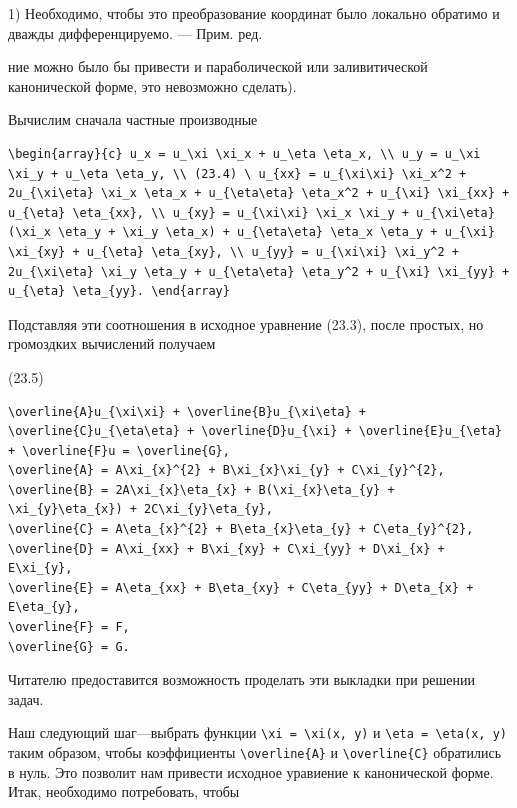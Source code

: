 \documentclass[
  ukrainian,
]{article}
\begin{document}
1) Необходимо, чтобы это преобразование координат было локально обратимо
и дважды дифференцируемо. --- Прим. ред.

ние можно было бы привести и параболической или заливитической
канонической форме, это невозможно сделать).

Вычислим сначала частные производные

\begin{verbatim}
\begin{array}{c} u_x = u_\xi \xi_x + u_\eta \eta_x, \\ u_y = u_\xi \xi_y + u_\eta \eta_y, \\ (23.4) \ u_{xx} = u_{\xi\xi} \xi_x^2 + 2u_{\xi\eta} \xi_x \eta_x + u_{\eta\eta} \eta_x^2 + u_{\xi} \xi_{xx} + u_{\eta} \eta_{xx}, \\ u_{xy} = u_{\xi\xi} \xi_x \xi_y + u_{\xi\eta} (\xi_x \eta_y + \xi_y \eta_x) + u_{\eta\eta} \eta_x \eta_y + u_{\xi} \xi_{xy} + u_{\eta} \eta_{xy}, \\ u_{yy} = u_{\xi\xi} \xi_y^2 + 2u_{\xi\eta} \xi_y \eta_y + u_{\eta\eta} \eta_y^2 + u_{\xi} \xi_{yy} + u_{\eta} \eta_{yy}. \end{array}
\end{verbatim}

Подставляя эти соотношения в исходное уравнение (23.3), после простых,
но громоздких вычислений получаем

(23.5)

\begin{verbatim}
\overline{A}u_{\xi\xi} + \overline{B}u_{\xi\eta} + \overline{C}u_{\eta\eta} + \overline{D}u_{\xi} + \overline{E}u_{\eta} + \overline{F}u = \overline{G},
\overline{A} = A\xi_{x}^{2} + B\xi_{x}\xi_{y} + C\xi_{y}^{2},
\overline{B} = 2A\xi_{x}\eta_{x} + B(\xi_{x}\eta_{y} + \xi_{y}\eta_{x}) + 2C\xi_{y}\eta_{y},
\overline{C} = A\eta_{x}^{2} + B\eta_{x}\eta_{y} + C\eta_{y}^{2},
\overline{D} = A\xi_{xx} + B\xi_{xy} + C\xi_{yy} + D\xi_{x} + E\xi_{y},
\overline{E} = A\eta_{xx} + B\eta_{xy} + C\eta_{yy} + D\eta_{x} + E\eta_{y},
\overline{F} = F,
\overline{G} = G.
\end{verbatim}

Читателю предоставится возможность проделать эти выкладки при решении
задач.

Наш следующий шаг---выбрать функции
\texttt{\textbackslash{}xi\ =\ \textbackslash{}xi(x,\ y)} и
\texttt{\textbackslash{}eta\ =\ \textbackslash{}eta(x,\ y)} таким
образом, чтобы коэффициенты \texttt{\textbackslash{}overline\{A\}} и
\texttt{\textbackslash{}overline\{C\}} обратились в нуль. Это позволит
нам привести исходное уравиение к канонической форме. Итак, необходимо
потребовать, чтобы
\end{document}
